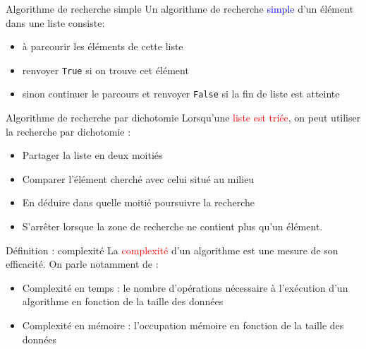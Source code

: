 \documentclass[10pt]{beamer}
\begin{document}
\begin{frame}
	\mframe{\NA}
	\begin{block}{Algorithme de recherche simple}
		Un algorithme de recherche \textcolor{blue}{simple} d'un élément dans une liste consiste:
		\begin{itemize}[label=\textbullet]
			\item<2-> à parcourir les éléments de cette liste
			\item<3-> renvoyer {\tt True} si on trouve cet élément
			\item<4-> sinon continuer le parcours et renvoyer {\tt False} si la fin de liste est atteinte
		\end{itemize}
	\end{block}	
\end{frame}

\begin{frame}
	\mframe{\NA}
	\begin{block}{Algorithme de recherche par dichotomie}
		Lorsqu'une \textcolor{red}{liste est triée}, on peut utiliser la recherche par dichotomie :
		\begin{itemize}[label=\textbullet]
			\item<2-> Partager la liste en deux moitiés
			\item<3-> Comparer l'élément cherché avec celui situé au milieu
			\item<4-> En déduire dans quelle moitié poursuivre la recherche
			\item<5-> S'arrêter lorsque la zone de recherche ne contient plus qu'un élément.
		\end{itemize}
	\end{block}	
\end{frame}


\begin{frame}
	\mframe{\NA}
	\begin{alertblock}{Définition : complexité}
		La \textcolor{red}{complexité} d'un algorithme est une mesure de son efficacité.
		\onslide<2-> On parle notamment de :
		\begin{itemize}[label=\textbullet]
			\item<3-> Complexité en temps : le nombre d'opérations nécessaire à l'exécution d'un algorithme en fonction de la taille des données
			\item<4-> Complexité en mémoire : l'occupation mémoire en fonction de la taille des données
		\end{itemize}
	\end{alertblock}
\end{frame}
\end{document}
